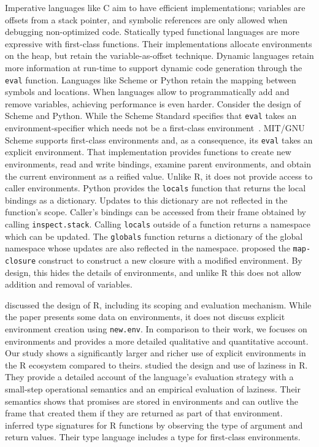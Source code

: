 \documentclass[10pt,sigplan,authorversion=true]{acmart}
\renewcommand{\c}[1]{\lstinline |#1|\xspace}
\begin{document}
Imperative languages like C aim to have efficient implementations; variables are
offsets from a stack pointer, and symbolic references are only allowed when
debugging non-optimized code. Statically typed functional languages are more
expressive with first-class functions. Their implementations allocate
environments on the heap, but retain the variable-as-offset technique. Dynamic
languages retain more information at run-time to support dynamic code generation
through the \c{eval} function. Languages like Scheme or Python retain the
mapping between symbols and locations. When languages allow to programmatically
add and remove variables, achieving performance is even harder. Consider the
design of Scheme and Python. While the Scheme Standard specifies that
\c{eval} takes an environment-specifier which needs not be a first-class
environment~\cite{SchemeR5RS}. MIT/GNU Scheme supports first-class environments
and, as a consequence, its \c{eval} takes an explicit environment. That
implementation provides functions to create new environments, read and write
bindings, examine parent environments, and obtain the current environment as a
reified value. Unlike R, it does not provide access to caller environments.
Python provides the \c{locals} function that returns the local bindings as a
dictionary. Updates to this dictionary are not reflected in the function's
scope. Caller's bindings can be accessed from their frame obtained by calling
\c{inspect.stack}. Calling \c{locals} outside of a function returns a
namespace which can be updated. The \c{globals} function returns a dictionary
of the global namespace whose updates are also reflected in the namespace.
\citet{Siskind07} proposed the \c{map-closure} construct to construct a new
closure with a modified environment. By design, this hides the details of
environments, and unlike R this does not allow addition and removal of variables.

\citet{ecoop12} discussed the design of R, including its scoping and evaluation
mechanism. While the paper presents some data on environments, it does not
discuss explicit environment creation using \c{new.env}. In comparison to
their work, we focuses on environments and provides a more detailed qualitative
and quantitative account. Our study shows a significantly larger and richer use
of explicit environments in the R ecosystem compared to theirs.
\citet{oopsla19b} studied the design and use of laziness in R. They provide a
detailed account of the language’s evaluation strategy with a small-step
operational semantics and an empirical evaluation of laziness. Their semantics
shows that promises are stored in environments and can outlive the frame that
created them if they are returned as part of that environment. \citet{oopsla20b}
inferred type signatures for R functions by observing the type of argument and
return values. Their type language includes a type for first-class environments.
\end{document}
